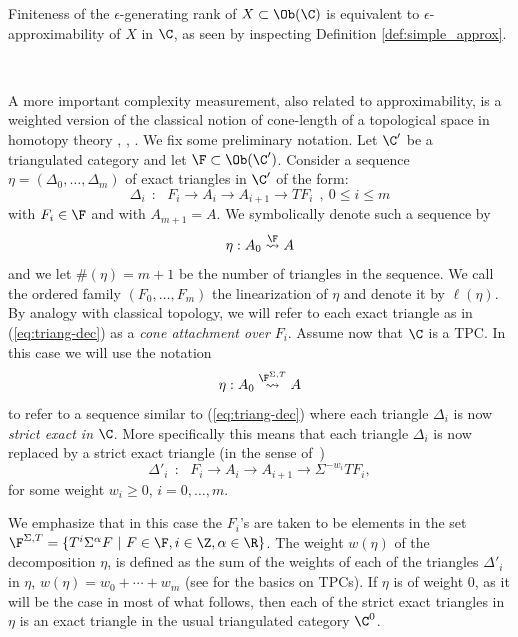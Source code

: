 Finiteness of the $\epsilon$-generating rank of
$X\subset \Ob(\C)$ is equivalent to $\epsilon$-approximability of
$X$ in $\C$, as seen by inspecting Definition \ref{def:simple_approx}.

\

A more important complexity measurement, also related to
approximability, is a weighted version of the classical notion of
cone-length of a topological space in homotopy theory \cite{Gan:cat},
\cite{Cor:cone-LS}, \cite{Cor:cone-SCat}.  We fix some preliminary
notation. Let $\C'$ be a triangulated category and let
$\F\subset \Ob(\C')$.  Consider a sequence
$\eta=(\Delta_{0},\ldots, \Delta_{m})$ of exact triangles in
$\C'$ of the form:
\begin{equation}\label{eq:triang-dec}\Delta_{i} \ \ : \ \ \
  F_{i}\longrightarrow A_{i}\longrightarrow A_{i+1}\longrightarrow
  TF_{i} \ \ , \ 0\leq i \leq m
\end{equation}
with $F_{i}\in \F$ and with $A_{m+1}=A$. We symbolically denote such a
sequence by $$\eta: A_{0} \stackrel{\F}{\rightsquigarrow} A$$ and we
let $\#(\eta)=m+1$ be the number of triangles in the sequence.  We
call the ordered family $(F_{0},\ldots, F_{m})$ the linearization of
$\eta$ and denote it by $\ell(\eta)$. By analogy with classical
topology, we will refer to each exact triangle as in
(\ref{eq:triang-dec}) as a {\em cone attachment over} $F_{i}$.  Assume
now that $\C$ is a TPC. In this case we will use the
notation $$\eta:A_{0}\stackrel{\F^{\Sigma, T}}{\rightsquigarrow} A$$
to refer to a sequence similar to (\ref{eq:triang-dec}) where
each triangle $\Delta_{i}$ is now {\em strict exact in}
$\C$. More specifically this means that each triangle
  $\Delta_i$ is now replaced by a strict exact triangle (in the sense
  of~\cite[Definition~2.42]{BCZ:tpc})
\begin{equation*} \label{eq:triang-dec-weighted} \Delta'_{i} \ \ : \ \
  \ F_{i}\longrightarrow A_{i}\longrightarrow A_{i+1}\longrightarrow
  \Sigma^{-w_i} TF_{i},
\end{equation*}
for some weight $w_i \geq 0$, $i = 0, \ldots, m$.

We emphasize that in this case the $F_{i}$'s are taken to be elements
in the set
$\mathcal{\F}^{\Sigma, T}=\{ T^{i}\Sigma^{\alpha} F \ | \ F\in \F ,
i\in \Z, \alpha\in \R\}$. The weight $w(\eta)$ of the decomposition
$\eta$, is defined as the sum of the weights of each of the triangles
$\Delta'_i$ in $\eta$, $w(\eta) = w_0 + \cdots + w_m$ (see
\cite{BCZ:tpc} for the basics on TPCs). If $\eta$ is of weight $0$, as
it will be the case in most of what follows, then each of the strict
exact triangles in $\eta$ is an exact triangle in the usual
triangulated category $\C^{0}$.
 
